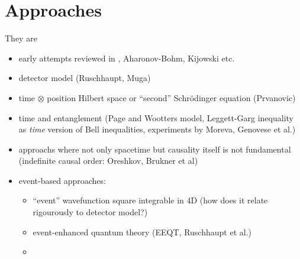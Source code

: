 \section{Approaches}

They are

\begin{itemize}
\item early attempts reviewed in \cite{TQM1, TQM2}, Aharonov-Bohm, Kijowski etc.
\item detector model (Ruschhaupt, Muga) \cite{TQM1, TQM2}
\item
    time $\otimes$ position Hilbert space or ``second'' Schr\"odinger equation (Prvanovic)
\item time and entanglement (Page and Wootters model, Leggett-Garg inequality as \emph{time} version of Bell inequalities, experiments by Moreva, Genovese et al.)
\item approachs where not only spacetime but causality itself is not fundamental (indefinite causal order: Oreshkov, Brukner et al)
\item event-based approaches: 
    \begin{itemize}
        \item ``event'' wavefunction square integrable in 4D (how does it relate rigourously to detector model?)
        \item event-enhanced quantum theory (EEQT, Ruschhaupt et al.)
        \item 
    \end{itemize}
\end{itemize}